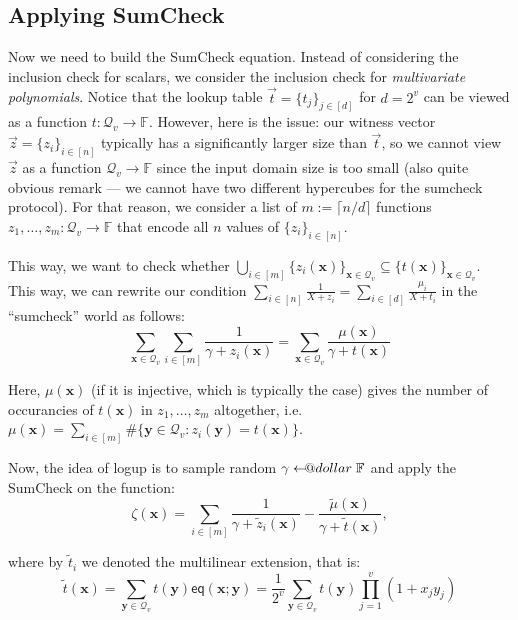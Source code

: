 \documentclass{lookup-template}
\makeatletter
\newcommand\leftarrowS{\leftarrow\joinrel\smalldollar}
\newcommand{\smalldollar}{\mathrel{\mathpalette\small@dollar\relax}}
\newcommand{\small@dollar}[2]{%
  \vcenter{\hbox{%
    $#1\textnormal{\fontsize{0.7\dimexpr\f@size pt}{0}\selectfont\$}$%
  }}%
}
\makeatother
\begin{document}
\subsection*{Applying SumCheck}

Now we need to build the SumCheck equation. Instead of considering the inclusion
check for scalars, we consider the inclusion check for \textit{multivariate
polynomials}. Notice that the lookup table $\vec{t} = \{t_j\}_{j \in [d]}$ for
$d=2^v$ can be viewed as a function $t: \mathcal{Q}_v \to \mathbb{F}$. However,
here is the issue: our witness vector $\vec{z} = \{z_i\}_{i \in [n]}$ typically
has a significantly larger size than $\vec{t}$, so we cannot view $\vec{z}$ as a
function $\mathcal{Q}_v \to \mathbb{F}$ since the input domain size is too small
(also quite obvious remark --- we cannot have two different hypercubes for the
sumcheck protocol). For that reason, we consider a list of $m := \lceil n/d
\rceil$ functions $z_1,\dots,z_m: \mathcal{Q}_v \to \mathbb{F}$ that encode all
$n$ values of $\{z_i\}_{i \in [n]}$.

This way, we want to check whether $\bigcup_{i \in
[m]}\{z_i(\mathbf{x})\}_{\mathbf{x} \in \mathcal{Q}_v} \subseteq
\{t(\mathbf{x})\}_{\mathbf{x} \in \mathcal{Q}_v}$. This way, we can rewrite our
condition $\sum_{i \in [n]} \frac{1}{X+z_i} = \sum_{i \in [d]}
\frac{\mu_i}{X+t_i}$ in the ``sumcheck'' world as follows:
\begin{equation*}
    \sum_{\mathbf{x} \in \mathcal{Q}_v}\sum_{i \in [m]} \frac{1}{\gamma + z_i(\mathbf{x})} = \sum_{\mathbf{x} \in \mathcal{Q}_v} \frac{\mu(\mathbf{x})}{\gamma + t(\mathbf{x})}
\end{equation*}

Here, $\mu(\mathbf{x})$ (if it is injective, which is typically the case) gives the
number of occurancies of $t(\mathbf{x})$ in $z_1,\dots,z_m$ altogether, i.e.
$\mu(\mathbf{x}) = \sum_{i \in [m]}\#\{\mathbf{y} \in \mathcal{Q}_v:
z_i(\mathbf{y}) = t(\mathbf{x})\}$.

Now, the idea of logup is to sample random $\gamma \leftarrowS \mathbb{F}$ and 
apply the SumCheck on the function:
\begin{equation*}
    \zeta(\mathbf{x}) = \sum_{i \in [m]} \frac{1}{\gamma + \widetilde{z}_i(\mathbf{x})} - \frac{\widetilde{\mu}(\mathbf{x})}{\gamma + \widetilde{t}(\mathbf{x})},
\end{equation*}

where by $\widetilde{t}_i$ we denoted the multilinear extension, that is:
\begin{equation*}
\widetilde{t}(\mathbf{x}) = \sum_{\mathbf{y} \in \mathcal{Q}_v}
t(\mathbf{y})\mathsf{eq}(\mathbf{x}; \mathbf{y}) = \frac{1}{2^v}\sum_{\mathbf{y} \in \mathcal{Q}_v}t(\mathbf{y})\prod_{j=1}^v(1+x_jy_j) 
\end{equation*}
\end{document}

